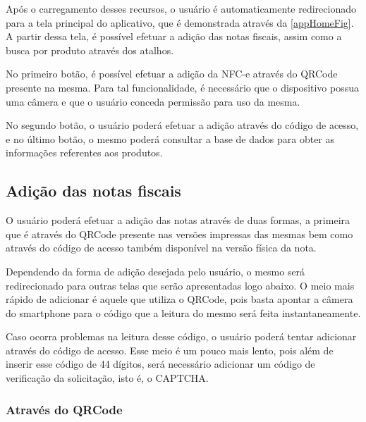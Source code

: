 \newpage
Após o carregamento desses recursos, o usuário é automaticamente redirecionado para a tela principal do aplicativo, que é demonstrada através da \autoref{appHomeFig}. A partir dessa tela, é possível efetuar a adição das notas fiscais, assim como a busca por produto através dos atalhos.

No primeiro botão, é possível efetuar a adição da NFC-e através do QRCode presente na mesma. Para tal funcionalidade, é necessário que o dispositivo possua uma câmera e que o usuário conceda permissão para uso da mesma.

No segundo botão, o usuário poderá efetuar a adição através do código de acesso, e no último botão, o mesmo poderá consultar a base de dados para obter as informações referentes aos produtos.

\subsection{Adição das notas fiscais}

O usuário poderá efetuar a adição das notas através de duas formas, a primeira que é através do QRCode presente nas versões impressas das mesmas bem como através do código de acesso também disponível na versão física da nota.

Dependendo da forma de adição desejada pelo usuário, o mesmo será redirecionado para outras telas que serão apresentadas logo abaixo. O meio mais rápido de adicionar é aquele que utiliza o QRCode, pois basta apontar a câmera do smartphone para o código que a leitura do mesmo será feita instantaneamente.

Caso ocorra problemas na leitura desse código, o usuário poderá tentar adicionar através do código de acesso. Esse meio é um pouco mais lento, pois além de inserir esse código de 44 dígitos, será necessário adicionar um código de verificação da solicitação, isto é, o CAPTCHA.

\subsubsection{Através do QRCode}

